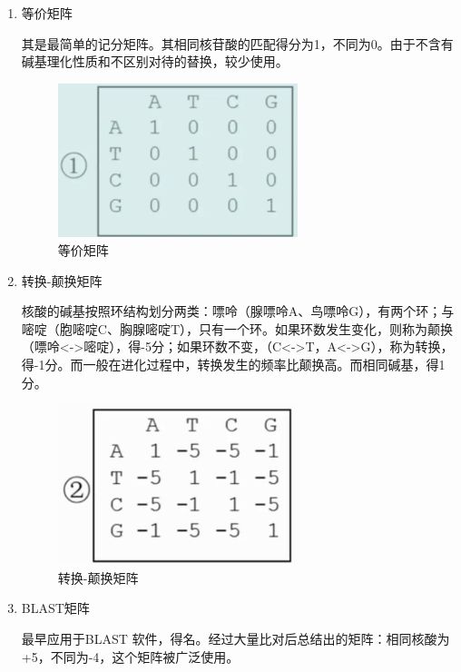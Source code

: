 \begin{enumerate}
    \item 等价矩阵

          其是最简单的记分矩阵。其相同核苷酸的匹配得分为1，不同为0。由于不含有碱基理化性质和不区别对待的替换，较少使用。

          \begin{figure}[htbp]
              \centering
              \includegraphics[width=7cm]{image/Alignment/等价矩阵.png}
              \caption{等价矩阵}
          \end{figure}

    \item 转换-颠换矩阵

          核酸的碱基按照环结构划分两类：嘌呤（腺嘌呤A、鸟嘌呤G），有两个环；与嘧啶（胞嘧啶C、胸腺嘧啶T），只有一个环。如果环数发生变化，则称为颠换（嘌呤<->嘧啶），得-5分；如果环数不变，（C<->T，A<->G），称为转换，得-1分。而一般在进化过程中，转换发生的频率比颠换高。而相同碱基，得1分。

          \clearpage

          \begin{figure}[htbp]
              \centering
              \includegraphics[width=7cm]{image/Alignment/转换-颠换矩阵.png}
              \caption{转换-颠换矩阵}
          \end{figure}

    \item BLAST矩阵

          最早应用于BLAST 软件，得名。经过大量比对后总结出的矩阵：相同核酸为+5，不同为-4，这个矩阵被广泛使用。


\end{enumerate}

